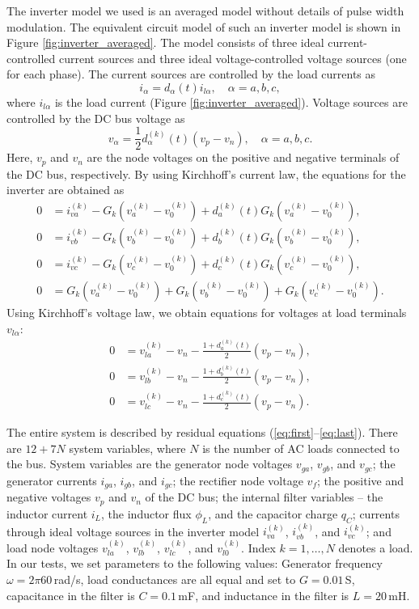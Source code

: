\documentclass[10pt]{ijnam}
\theoremstyle{definition}
\begin{document}
The inverter model we used is an averaged model without details of 
pulse width modulation. The equivalent circuit model of such an
inverter model is shown in Figure \ref{fig:inverter_averaged}. 
The model consists of three ideal current-controlled current sources 
and three ideal voltage-controlled voltage sources (one for each phase). 
The current sources are controlled by the load currents as
\begin{equation*}
    i_\alpha = d_\alpha (t) i_{l \alpha}, \quad \alpha = a,b,c,
\end{equation*}
where $i_{l \alpha}$ is the load current (Figure \ref{fig:inverter_averaged}).
Voltage sources are controlled by the DC bus voltage as
\begin{equation*}
    v_\alpha = \frac{1}{2} d^{(k)}_\alpha(t)(v_p - v_n), \quad \alpha = a,b,c.
\end{equation*}
Here, $v_p$ and $v_n$ are the node voltages on the positive and negative terminals of 
the DC bus, respectively. By using Kirchhoff's current law, the equations for 
the inverter are obtained as
\begin{align}
    0 &= i^{(k)}_{va} - G_k (v^{(k)}_a - v^{(k)}_0) 
           + d^{(k)}_a(t) G_k (v^{(k)}_a - v^{(k)}_0), \\
    0 &= i^{(k)}_{vb} - G_k (v^{(k)}_b - v^{(k)}_0) 
           + d^{(k)}_b(t) G_k (v^{(k)}_b - v^{(k)}_0), \\
    0 &= i^{(k)}_{vc} - G_k (v^{(k)}_c - v^{(k)}_0) 
           + d^{(k)}_c(t) G_k (v^{(k)}_c - v^{(k)}_0), \\
    0 &= G_k (v^{(k)}_a - v^{(k)}_0) + G_k (v^{(k)}_b - v^{(k)}_0) 
       + G_k (v^{(k)}_c - v^{(k)}_0).
\end{align}
Using Kirchhoff's voltage law, we obtain equations for voltages at load 
terminals $v_{l \alpha}$:
\begin{align}
    0 &= v^{(k)}_{la} - v_n -\frac{1 + d^{(k)}_a(t)}{2}(v_p - v_n), \\
    0 &= v^{(k)}_{lb} - v_n -\frac{1 + d^{(k)}_b(t)}{2}(v_p - v_n), \\
    0 &=  v^{(k)}_{lc} - v_n -\frac{1 + d^{(k)}_c(t)}{2}(v_p - v_n). \label{eq:last}
\end{align}

The entire system is described by residual equations 
(\ref{eq:first}--\ref{eq:last}). There are $12 + 7N$ system variables, 
where $N$ is the number of AC loads connected to the bus. System variables 
are the generator node voltages $v_{ga}$, $v_{gb}$, and $v_{gc}$; the generator 
currents $i_{ga}$, $i_{gb}$, and $i_{gc}$; the rectifier node voltage $v_f$;
the positive and negative voltages $v_p$ and $v_n$ of the DC bus; the internal filter
variables -- the inductor current $i_L$, the inductor flux $\phi_L$, and the capacitor
charge $q_C$; currents through ideal voltage sources in the inverter
model $i^{(k)}_{va}$, $i^{(k)}_{vb}$, and $i^{(k)}_{vc}$; and load node 
voltages $v^{(k)}_{la}$, $v^{(k)}_{lb}$, $v^{(k)}_{lc}$, and $v^{(k)}_{l0}$.
Index $k=1,\ldots,N$ denotes a load. In our tests, we set parameters to 
the following values: Generator frequency $\omega = 2 \pi 60 \,$rad/s, load 
conductances are all equal and set to $G=0.01\,$S, capacitance in the filter 
is $C=0.1\,$mF, and inductance in the filter is $L=20\,$mH. 
\end{document}
